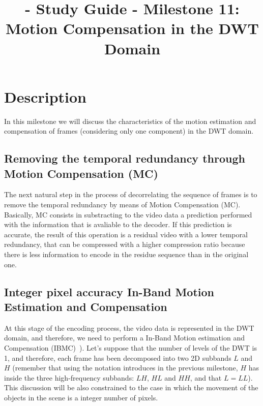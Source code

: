 
\title{\SM{} - Study Guide - Milestone 11: Motion Compensation in the DWT Domain}

\maketitle

\tableofcontents

\section{Description}

In this milestone we will discuss the characteristics of the motion
estimation and compensation of frames (considering only one component)
in the DWT domain.

\subsection{Removing the temporal redundancy through Motion Compensation (MC)}
The next natural step in the process of decorrelating the sequence of
frames is to remove the temporal redundancy by means of Motion
Compensation (MC). Basically, MC consists in substracting to the video
data a prediction performed with the information that is avaliable to
the decoder. If this prediction is accurate, the result of this
operation is a residual video with a lower temporal redundancy, that
can be compressed with a higher compression ratio because there is
less information to encode in the residue sequence than in the
original one.

\subsection{Integer pixel accuracy In-Band Motion Estimation and Compensation}
At this stage of the encoding process, the video data is represented
in the DWT domain, and therefore, we need to perform a In-Band Motion
estimation and Compensation
(IBMC)~\cite{andreopoulos2005complete}). Let's suppose that the number
of levels of the DWT is 1, and therefore, each frame has been
decomposed into two 2D subbands $L$ and $H$ (remember that using the
notation introduces in the previous milestone, $H$ has inside the
three high-frequency subbands: $LH$, $HL$ and $HH$, and that
$L=LL$). This discussion will be also constrained to the case in which
the movement of the objects in the scene is a integer number of
pixels.

